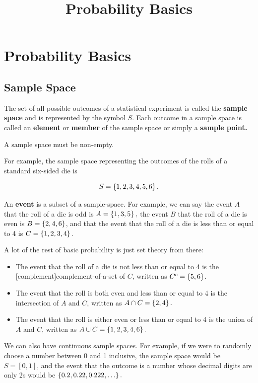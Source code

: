 \documentclass{article}
\title{Probability Basics}
\begin{document}
\section{Probability Basics}

\subsection{Sample Space}

\begin{definition}
The \@{set} of all possible outcomes of a statistical experiment is called the \textbf{sample space} and is represented by the symbol $S$. Each outcome in a sample space is called an \textbf{\@{element}} or \textbf{\@{member}} of the sample space or simply a \textbf{sample point.}

A sample space must be non-empty.
\end{definition}

For example, the \@{sample space} representing the outcomes of the rolls of a standard six-sided die is

\[ S = \left\{ 1, 2, 3, 4, 5, 6 \right\}. \]

\begin{definition}[Event]
An \textbf{event} is a \@{subset} of a \@{sample-space}. For example, we can say the event $A$ that the roll of a die is odd is $A = \left\{ 1,3,5 \right\},$ the event $B$ that the roll of a die is even is $B = \left\{ 2,4,6 \right\}$, and that the event that the roll of a die is less than or equal to 4 is $C = \left\{ 1,2,3,4 \right\}.$
\end{definition}

A lot of the rest of basic \@{probability} is just set theory from there:

\begin{itemize}
\item The \@{event} that the roll of a die is not less than or equal to 4 is the \@[complement]{complement-of-a-set} of $C$, written as $C^c = \left\{ 5,6 \right\}$.
\item The event that the roll is both even and less than or equal to 4 is the intersection of $A$ and $C$, written as $A \cap C = \left\{ 2,4 \right\}.$
\item The event that the roll is either even or less than or equal to 4 is the union of $A$ and $C$, written as $A \cup C = \left\{ 1,2,3,4,6 \right\}.$
\end{itemize}

We can also have \@{continuous sample spaces}. For example, if we were to randomly choose a number between 0 and 1 inclusive, the \@{sample space} would be $S = [0, 1]$, and the \@{event} that the outcome is a number whose decimal digits are only 2s would be $\set{0.2, 0.22, 0.222, \dots}.$
\end{document}
